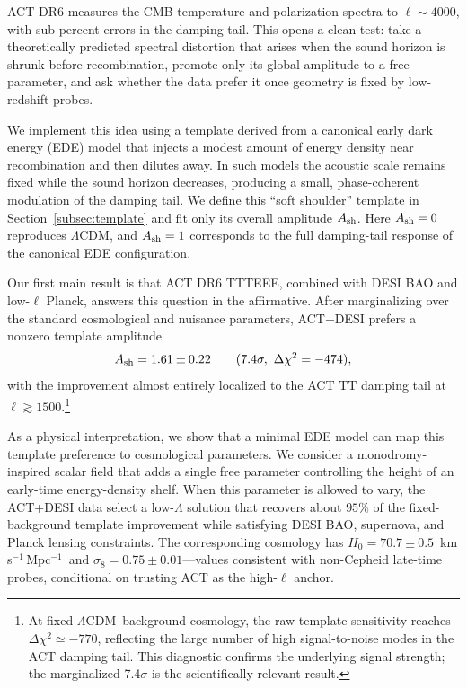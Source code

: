 \documentclass[twocolumn,showpacs,preprintnumbers,amsmath,amssymb,prd]{revtex4-2}
\newcommand{\lcdm}{$\Lambda$CDM}
\newcommand{\kms}{km\,s$^{-1}$\,Mpc$^{-1}$}
\begin{document}
ACT DR6 measures the CMB temperature and polarization spectra to $\ell \sim 4000$, with sub-percent errors in the damping tail. This opens a clean test: take a theoretically predicted spectral distortion that arises when the sound horizon is shrunk before recombination, promote only its global amplitude to a free parameter, and ask whether the data prefer it once geometry is fixed by low-redshift probes.

We implement this idea using a template derived from a canonical early dark energy (EDE) model that injects a modest amount of energy density near recombination and then dilutes away. In such models the acoustic scale remains fixed while the sound horizon decreases, producing a small, phase-coherent modulation of the damping tail. We define this ``soft shoulder'' template in Section~\ref{subsec:template} and fit only its overall amplitude $A_{\rm sh}$. Here $A_{\rm sh} = 0$ reproduces \lcdm, and $A_{\rm sh} = 1$ corresponds to the full damping-tail response of the canonical EDE configuration.

Our first main result is that ACT DR6 TTTEEE, combined with DESI BAO and low-$\ell$ Planck, answers this question in the affirmative. After marginalizing over the standard cosmological and nuisance parameters, ACT+DESI prefers a nonzero template amplitude
\begin{equation}
A_{\rm sh} = 1.61 \pm 0.22 \qquad (7.4\sigma,\ \Delta\chi^2 = -474),
\end{equation}
with the improvement almost entirely localized to the ACT TT damping tail at $\ell \gtrsim 1500$.\footnote{At fixed \lcdm\ background cosmology, the raw template sensitivity reaches $\Delta\chi^2 \simeq -770$, reflecting the large number of high signal-to-noise modes in the ACT damping tail. This diagnostic confirms the underlying signal strength; the marginalized 7.4$\sigma$ is the scientifically relevant result.}

As a physical interpretation, we show that a minimal EDE model can map this template preference to cosmological parameters. We consider a monodromy-inspired scalar field that adds a single free parameter controlling the height of an early-time energy-density shelf. When this parameter is allowed to vary, the ACT+DESI data select a low-$\Lambda$ solution that recovers about $95\%$ of the fixed-background template improvement while satisfying DESI BAO, supernova, and Planck lensing constraints. The corresponding cosmology has $H_0 = 70.7 \pm 0.5$~\kms\ and $\sigma_8 = 0.75 \pm 0.01$---values consistent with non-Cepheid late-time probes, conditional on trusting ACT as the high-$\ell$ anchor.
\end{document}

